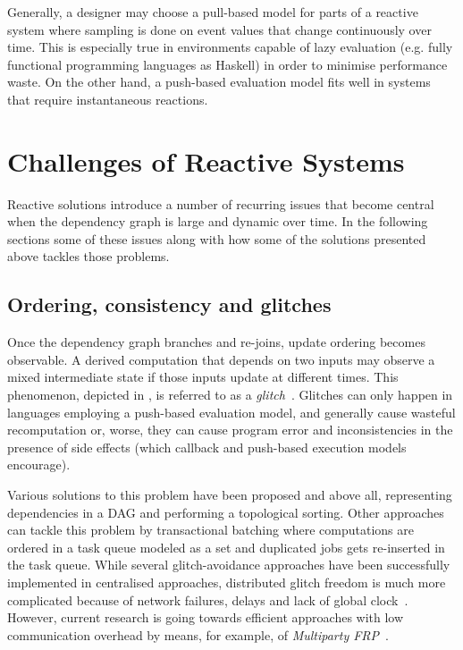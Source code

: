 Generally, a designer may choose a pull-based model for parts of a reactive
system where sampling is done on event values that change continuously over
time. This is especially true in environments capable of lazy evaluation (e.g.
fully functional programming languages as Haskell) in order to minimise
performance waste. On the other hand, a push-based evaluation model fits well
in systems that require instantaneous reactions.

\section{Challenges of Reactive Systems}
Reactive solutions introduce a number of recurring issues that become central
when the dependency graph is large and dynamic over time. In the following
sections some of these issues along with how some of the solutions presented
above tackles those problems.

\subsection{Ordering, consistency and glitches}\label{ssec:glitches}
Once the dependency graph branches and re-joins, update ordering becomes
observable. A derived computation that depends on two inputs may observe a
mixed intermediate state if those inputs update at different times. This
phenomenon, depicted in , is referred to as a
\emph{glitch}~\cite{cooper2006EDDCBYVL}.
%
%
Glitches can only happen in languages employing a push-based evaluation model,
and generally cause wasteful recomputation or, worse, they can cause program
error and inconsistencies in the presence of side effects (which callback and
push-based execution models encourage).

Various solutions to this problem have been proposed and above all,
representing dependencies in a DAG and performing a topological sorting. Other
approaches can tackle this problem by transactional batching where computations
are ordered in a task queue modeled as a set and duplicated jobs gets
re-inserted in the task queue. While several glitch-avoidance approaches have
been successfully implemented in centralised approaches, distributed glitch
freedom is much more complicated because of network failures, delays and lack
of global clock~\cite{bainomugisha2013SRP}. However, current research is going
towards efficient approaches with low communication overhead by means, for
example, of \emph{Multiparty \ac{FRP}}~\cite{moriguchi2023DDSMFRP}.

